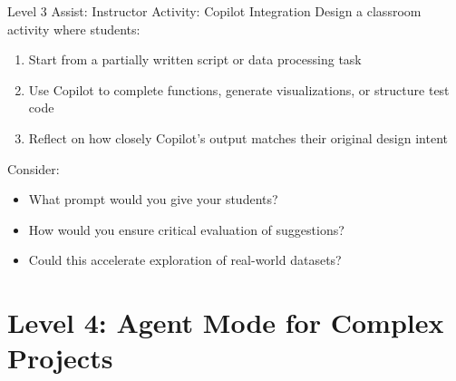 \documentclass[xcolor=dvipsnames, aspectratio=169]{beamer}
\begin{document}
\begin{frame}{Level 3 Assist: Instructor Activity: Copilot Integration}
  Design a classroom activity where students:
  \begin{enumerate}
    \item Start from a partially written script or data processing task
    \item Use Copilot to complete functions, generate visualizations, or structure test code
    \item Reflect on how closely Copilot's output matches their original design intent
  \end{enumerate}
  
  Consider:
  \begin{itemize}
    \item What prompt would you give your students?
    \item How would you ensure critical evaluation of suggestions?
    \item Could this accelerate exploration of real-world datasets?
  \end{itemize}
\end{frame}

\section{Level 4: Agent Mode for Complex Projects}
\end{document}
